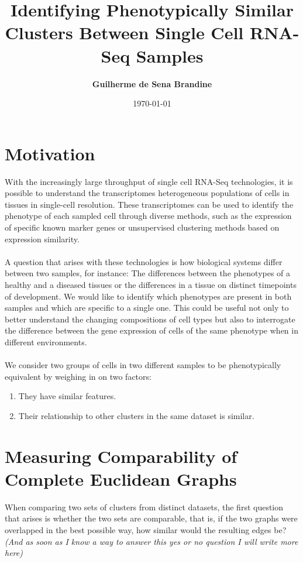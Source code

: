 \documentclass[11pt]{article}
\title{\bf Identifying Phenotypically Similar Clusters Between Single Cell RNA-Seq Samples}
\author{\bf Guilherme de Sena Brandine}
\date{\today}
\begin{document}
\maketitle

\section{Motivation}
With the increasingly large throughput of single cell RNA-Seq technologies, it is possible to understand the transcriptomes heterogeneous populations of cells in tissues in single-cell resolution. These transcriptomes can be used to identify the phenotype of each sampled cell through diverse methods, such as the expression of specific known marker genes or unsupervised clustering methods based on expression similarity. \\
\\
A question that arises with these technologies is how biological systems differ between two samples, for instance: The differences between the phenotypes of a healthy and a diseased tissues or the differences in a tissue on distinct timepoints of development. We would like to identify which phenotypes are present in  both samples and which are specific to a single one. This could be useful not only to better understand the changing compositions of cell types but also to interrogate the difference between the gene expression of cells of the same phenotype when in different environments. \\
\\
We consider two groups of cells in two different samples to be phenotypically equivalent by weighing in on two factors:

\begin{enumerate}
\item They have similar features.
\item Their relationship to other clusters in the same dataset is similar. 
\end{enumerate}

\section{Measuring Comparability of Complete Euclidean Graphs}
When comparing two sets of clusters from distinct datasets, the first question that arises is whether the two sets are comparable, that is, if the two graphs were overlapped in the best possible way, how similar would the resulting edges be? \emph{(And as soon as I know a way to answer this yes or no question I will write more here)}
\end{document}
